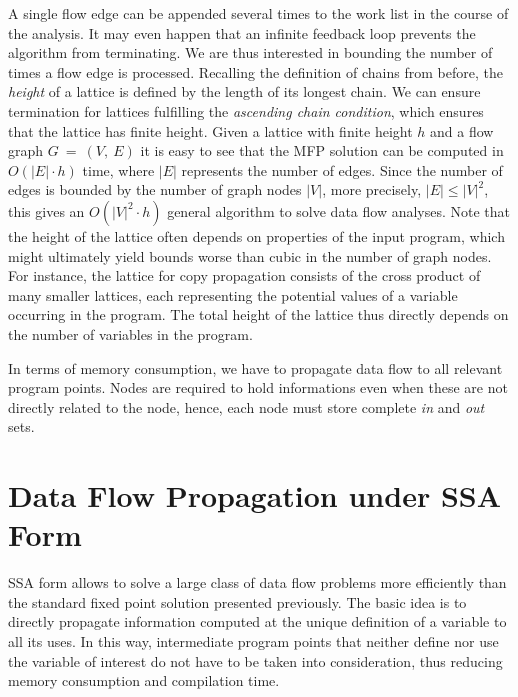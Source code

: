 A single flow edge can be appended several times to the
work list in the course of the analysis. It may even happen that an infinite
feedback loop prevents the algorithm from terminating. We are thus interested in
bounding the number of times a flow edge is processed. Recalling the definition
of chains from before, %
 the \emph{height} of a
lattice is defined by the length of its longest chain. We can ensure termination
for lattices fulfilling the \emph{ascending chain condition}, which ensures that
the lattice has finite height. Given a lattice with finite height $h$ and a flow
graph $G~=~(V,~E)$ it is easy to see that the MFP solution can be computed in
$O(|E| \cdot h)$ time, where $|E|$ represents the number of edges. Since the
number of edges is bounded by the number of graph nodes $|V|$, more precisely,
$|E| \leq |V|^2$, this gives an $O(|V|^2 \cdot h)$ general algorithm to
solve data flow analyses. Note that the height of
the lattice often depends on properties of the input program, which might
ultimately yield bounds worse than cubic in the number of graph nodes. For
instance, the lattice for copy propagation consists of the cross product of many
smaller lattices, each representing the potential values of a variable occurring
in the program. The total height of the lattice thus directly depends on the
number of variables in the program.

In terms of memory consumption, we have to propagate data flow to all relevant
program points. Nodes are required to hold informations even when these
are not directly related to the node, hence, each node must store 
complete \emph{in} and \emph{out} sets.


\section{Data Flow Propagation under SSA Form}
\label{chapter:constant_propagation_is_easier:sec:prop-engine}
\label{sec:prop-engine}

SSA form allows to solve a large class of data flow problems more efficiently
than the standard fixed point solution presented previously.
The basic idea is to directly propagate information computed at the unique
definition of a variable to all its uses. In this way, intermediate program
points that neither define nor use the variable of interest do not have to
be taken into consideration, thus reducing memory consumption
and compilation time.

